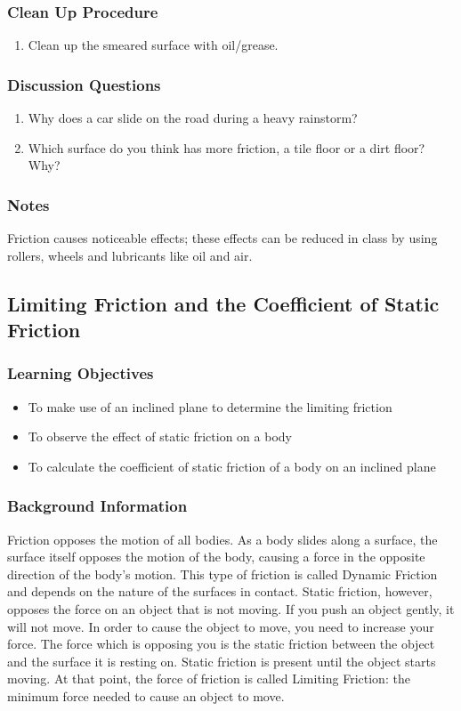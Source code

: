 \subsubsection*{Clean Up Procedure}
\begin{enumerate}
\item{Clean up the smeared surface with oil/grease.} 
\end{enumerate}

\subsubsection*{Discussion Questions}
\begin{enumerate}
\item{Why does a car slide on the road during a heavy rainstorm?}
\item{Which surface do you think has more friction, a tile floor or a dirt floor? Why?}
\end{enumerate}

\subsubsection*{Notes}
Friction causes noticeable effects; these effects can be reduced in class by using rollers, wheels and lubricants like oil and air.

\subsection{Limiting Friction and the Coefficient of Static Friction}

\subsubsection*{Learning Objectives}
\begin{itemize}
\item{To make use of an inclined plane to determine the limiting friction} 
\item{To observe the effect of static friction on a body} 
\item{To calculate the coefficient of static friction of a body on an inclined plane} 
\end{itemize}

\subsubsection*{Background Information}
Friction opposes the motion of all bodies. As a body slides along a surface, the surface itself opposes the motion of the body, causing a force in the opposite direction of the body's motion. This type of friction is called Dynamic Friction and depends on the nature of the surfaces in contact.  
Static friction, however, opposes the force on an object that is not moving. If you push an object gently, it will not move. In order to cause the object to move, you need to increase your force. The force which is opposing you is the static friction between the object and the surface it is resting on. Static friction is present until the object starts moving. At that point, the force of friction is called Limiting Friction: the minimum force needed to cause an object to move.  

